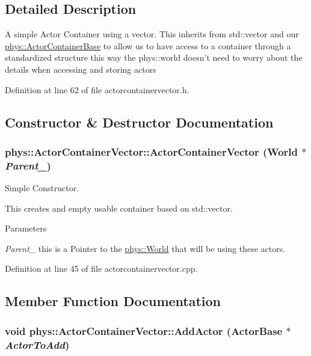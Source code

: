 \subsection{Detailed Description}
A simple Actor Container using a vector. This inherits from std::vector and our \hyperlink{classphys_1_1ActorContainerBase}{phys::ActorContainerBase} to allow us to have access to a container through a standardized structure this way the phys::world doesn't need to worry about the details when accessing and storing actors 

Definition at line 62 of file actorcontainervector.h.



\subsection{Constructor \& Destructor Documentation}
\hypertarget{classphys_1_1ActorContainerVector_a65a17a06bc964c2b5f04a8dbb003622a}{
\subsubsection[{ActorContainerVector}]{\setlength{\rightskip}{0pt plus 5cm}phys::ActorContainerVector::ActorContainerVector ({\bf World} $\ast$ {\em Parent\_\-})}}
\label{d3/d64/classphys_1_1ActorContainerVector_a65a17a06bc964c2b5f04a8dbb003622a}


Simple Constructor. 

This creates and empty usable container based on std::vector. 
\begin{DoxyParams}{Parameters}
\item[{\em Parent\_\-}]this is a Pointer to the \hyperlink{classphys_1_1World}{phys::World} that will be using these actors. \end{DoxyParams}


Definition at line 45 of file actorcontainervector.cpp.



\subsection{Member Function Documentation}
\hypertarget{classphys_1_1ActorContainerVector_a4bc3e38f16caddee021a97739bebaf6e}{
\subsubsection[{AddActor}]{\setlength{\rightskip}{0pt plus 5cm}void phys::ActorContainerVector::AddActor ({\bf ActorBase} $\ast$ {\em ActorToAdd})}}
\label{d3/d64/classphys_1_1ActorContainerVector_a4bc3e38f16caddee021a97739bebaf6e}


